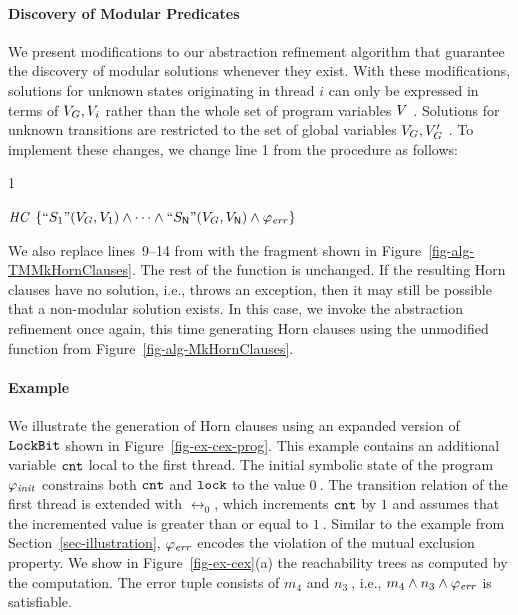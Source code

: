 \paragraph{Discovery of  Modular Predicates}
We present modifications to our abstraction refinement algorithm that
guarantee the discovery of modular solutions whenever they exist.
With these modifications, solutions for unknown states originating in
thread $i$ can only be expressed in terms of $V_G, V_{i}$
rather than the whole set of program variables $V\ $.
Solutions for unknown transitions are restricted to the set of global
variables $V_G, V_G'\ $.
To implement these changes, we change line 1 from the \algRefine
procedure as follows:
%
\begin{center}
  \begin{minipage}[t]{.04\columnwidth}
    1
  \end{minipage}
  \begin{minipage}[t]{.94\columnwidth}
    \tabT $\textit{HC}$ \algAssgn $\{\text{``}S_1\text{''}(V_G, V_{1})\land \dots
    \land \text{``}S_{\mathsf{N}}\text{''}(V_G, V_{\mathsf{N}}) \land \varphi_{\mathit{err}}\}$
  \end{minipage}
\end{center}
% 
We also replace lines~9--14 from \algMkHornClauses with the
fragment shown in Figure~\ref{fig-alg-TMMkHornClauses}.
The rest of the function \algMkHornClauses is unchanged.
If the resulting Horn clauses have no solution, i.e.,
\algSolveHornClauses throws an \algUnsolvable exception, then it may
still be possible that a non-modular solution exists.
In this case, we invoke the abstraction refinement once again, this
time generating Horn clauses using the unmodified function
\algMkHornClauses from Figure~\ref{fig-alg-MkHornClauses}.


\paragraph{Example}
We illustrate the generation of Horn clauses using an expanded
version of $\texttt{LockBit}$ shown in Figure~\ref{fig-ex-cex-prog}.
This example contains an additional variable $\mathtt{cnt}$ local to the
first thread.
The initial symbolic state of the program $\varphi_{\mathit{init}}$ constrains both
$\mathtt{cnt}$ and $\mathtt{lock}$ to the value $0\ $. 
The transition relation of the first thread is extended with $\rel_0$,
which increments $\mathtt{cnt}$ by $1$ and assumes that the incremented value
is greater than or equal to $1\ $.
Similar to the example from Section~\ref{sec-illustration},
$\varphi_{\mathit{err}}$ encodes the violation of the mutual exclusion property.
We show in Figure~\ref{fig-ex-cex}(a) the reachability trees as
computed by the \aret computation.
The error tuple consists of $m_4$ and $n_3\ $, i.e., $m_4
\land n_3 \land \varphi_{\mathit{err}}$ is satisfiable.

